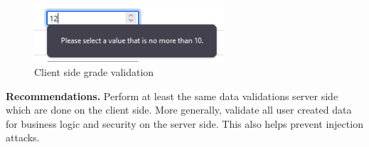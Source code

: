 \documentclass[parskip=half]{scrartcl}
\begin{document}
\begin{figure}
    \centering
    \includegraphics[width=200pt]{value_bound}
    \caption{Client side grade validation}
    \label{fig:grades:bound}
\end{figure}

\textbf{Recommendations.} Perform at least the same data validations server
side which are done on the client side. More generally, validate all user
created data for business logic and security on the server side. This also
helps prevent injection attacks.
\end{document}

